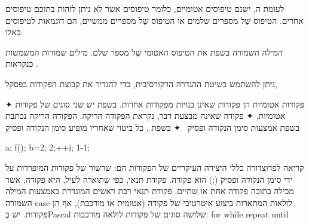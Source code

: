 לעומת ה, ישנם טיפוסים אטומיים, כלומר
טיפוסים אשר לא ניתן לזהות בתוכם טיפוסים אחרים. הטיפוס שֶׁל מספרים שלמים או
הטיפוס שֶׁל מספרים ממשיים, הם דוגמאות לטיפוסים כאלו.

המילה השמורה  בשפת   את הטיפוס האטומי שֶׁל מספר שלם.
מילים
שמורות המשמשות כ נקראות .

ניתן להשתמש בשיטת ההגדרה הרקורסיבית, כדי להגדיר את קבוצת הפקודות בפסקל,

✦  פקודות אטומיות הן פקודות שאינן בנויות מפקודות אחרות. בשפת  יש שני סוגים של פקודות אטומיות,
✦  פקודה שאינה מבצעת דבר, נקראת הפקודה הריקה. הפקודה הריקה נכתבת בשפת אמצעות סימן הנקודה ופסיק~\cc{;}
✦  בשפת , כל ביטוי שאחריו מופיע סימן הנקודה ופסיק~\cc{;}
\begin{CPP}
  a; f(); b=2; 2;++i; 1-1;
\end{CPP}
קריאה לפרוצדורה
כללי היצירה העיקריים של הפקודות הם:
שרשור של פקודות המופרדות על ידי סימן הנקודה ופסיק (;) הוא פקודה.
פקודת תנאי, כפי שתוארה לעיל, היא פקודה, אשר מכילה בתוכה פקודה אחת או שתיים.
פקודת תנאי רבת ראשים המוגדרת באמצעות המילה השמורה case
לולאות המתארות ביצוע איטרטיבי של פקודה (אטומית או מורכבת), אף הן פקודות. יש בְּPascal שלושה סוגים של פקודות לולאה מורכבות:
for
while
repeat until

